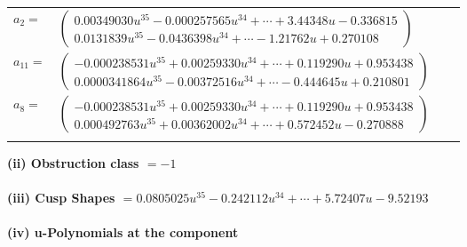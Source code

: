 \documentclass[1p]{elsarticle_modified}
\theoremstyle{definition}
\begin{document}
\begin{tabular}{m{7pt} m{180pt} m{7pt} m{180pt} }
\flushright $a_{2}=$&$\begin{pmatrix}0.00349030 u^{35}-0.000257565 u^{34}+\cdots+3.44348 u-0.336815\\0.0131839 u^{35}-0.0436398 u^{34}+\cdots-1.21762 u+0.270108\end{pmatrix}$ \\
\flushright $a_{11}=$&$\begin{pmatrix}-0.000238531 u^{35}+0.00259330 u^{34}+\cdots+0.119290 u+0.953438\\0.0000341864 u^{35}-0.00372516 u^{34}+\cdots-0.444645 u+0.210801\end{pmatrix}$ \\
\flushright $a_{8}=$&$\begin{pmatrix}-0.000238531 u^{35}+0.00259330 u^{34}+\cdots+0.119290 u+0.953438\\0.000492763 u^{35}+0.00362002 u^{34}+\cdots+0.572452 u-0.270888\end{pmatrix}$\\&\end{tabular}
\flushleft \textbf{(ii) Obstruction class $= -1$}\\~\\
\flushleft \textbf{(iii) Cusp Shapes $= 0.0805025 u^{35}-0.242112 u^{34}+\cdots+5.72407 u-9.52193$}\\~\\
\newpage\renewcommand{\arraystretch}{1}
\flushleft \textbf{(iv) u-Polynomials at the component}\newline \\
\end{document}
